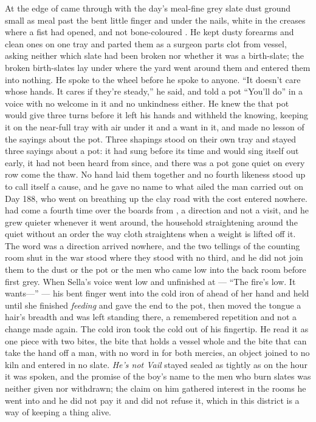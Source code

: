 At the edge of   came through with the day's meal-fine grey slate dust ground small as meal past the bent little finger and under the nails, white in the creases where a fist had opened, and not bone-coloured . He kept dusty forearms and clean ones on one tray and parted them as a surgeon parts clot from vessel, asking neither which slate had been broken nor whether it was a birth-slate; the broken birth-slates lay under  where the yard went around them and entered them into nothing. He spoke to the wheel before he spoke to anyone. “It doesn't care whose hands. It cares if they're steady,” he said, and told a pot “You'll do” in a voice with no welcome in it and no unkindness either. He knew the  that pot would give three turns before it left his hands and withheld the knowing, keeping it on the near-full tray with air under it and a want in it, and made no lesson of the sayings about the pot. Three shapings stood on their own tray and stayed three sayings about a pot: it had sung before its time and would sing itself out early, it had not been heard from since, and there was a pot gone quiet on every row come the thaw. No hand laid them together and no fourth likeness stood up to call itself a cause, and he gave no name to what ailed the man carried out on Day 188, who went on breathing up the clay road with the cost entered nowhere.  had come a fourth time over the boards from , a direction and not a visit, and he grew quieter whenever it went around, the household straightening around the quiet without an order the way cloth straightens when a weight is lifted off it. The word was a direction arrived nowhere, and the two tellings of the counting room shut in the war stood where they stood with no third, and he did not join them to the dust or the pot or the men who came low into the back room before first grey. When Sella's voice went low and unfinished at  --- “The fire's low. It wants---” --- his bent finger went into the cold iron of  ahead of her hand and held until she finished \emph{feeding} and gave the end to the pot, then moved the tongue a hair's breadth and was left standing there, a remembered repetition and not a change made again. The cold iron took the cold out of his fingertip. He read it as one piece with two bites, the bite that holds a vessel whole and the bite that can take the hand off a man, with no word in  for both mercies, an object joined to no kiln and entered in no slate. \emph{He's not Vail} stayed sealed as tightly as on the hour it was spoken, and the promise of the boy's name to the men who burn slates was neither given nor withdrawn; the claim on him gathered interest in the rooms he went into and he did not pay it and did not refuse it, which in this district is a way of keeping a thing alive.

